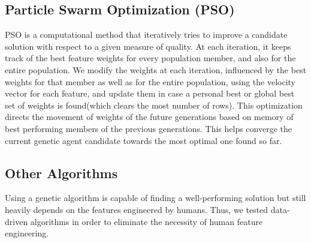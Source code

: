 


\subsection{Particle Swarm Optimization (PSO)}
PSO is a computational method that iteratively tries to improve a candidate solution with respect to a given measure of quality. At each iteration, it keeps track of the best feature weights for every population member, and also for the entire population. We modify the weights at each iteration, influenced by the best weights for that member as well as for the entire population, using the velocity vector for each feature, and update them in case a personal best or global best set of weights is found(which clears the most number of rows). This optimization directs the movement of weights of the future generations based on memory of best performing members of the previous generations. This helps converge the current genetic agent candidate towards the most optimal one found so far.

\subsection{Other Algorithms}
Using a genetic algorithm is capable of finding a well-performing solution but still heavily depends on the features engineered by humans. Thus, we tested data-driven algorithms in order to eliminate the necessity of human feature engineering.  

